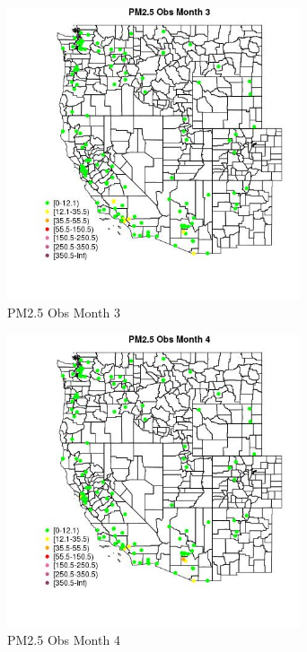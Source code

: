 \begin{figure} 
\centering  
\includegraphics[width=0.77\textwidth]{Code_Outputs/Report_ML_input_PM25_Step4_part_e_de_duplicated_aves_MapObsMo3PM25_Obs.jpg} 
\caption{\label{fig:Report_ML_input_PM25_Step4_part_e_de_duplicated_avesMapObsMo3PM25_Obs}PM2.5 Obs Month 3} 
\end{figure} 
 

\begin{figure} 
\centering  
\includegraphics[width=0.77\textwidth]{Code_Outputs/Report_ML_input_PM25_Step4_part_e_de_duplicated_aves_MapObsMo4PM25_Obs.jpg} 
\caption{\label{fig:Report_ML_input_PM25_Step4_part_e_de_duplicated_avesMapObsMo4PM25_Obs}PM2.5 Obs Month 4} 
\end{figure} 
 

